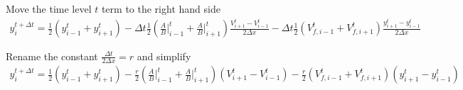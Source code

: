 Move the time level $t$ term to the right hand side
\begin{equation}
\begin{matrix}
y_i^{t+\Delta t} = \frac{1}{2}(y_{i-1}^t+y_{i+1}^t) -\Delta t\frac{1}{2}(\frac{A}{B}\vert_{i-1}^t + \frac{A}{B}\vert_{i+1}^t)\frac{V_{i+1}^{t}-V_{i-1}^t}{2\Delta x}-\Delta t \frac{1}{2}(V_{f,i-1}^t + V_{f,i+1}^t)\frac{y_{i+1}^{t}-y_{i-1}^t}{2\Delta x}\\
~\\
 \end{matrix}
\end{equation}
Rename the constant  $\frac{\Delta t}{2 \Delta x} = r$ and simplify
\begin{equation}
\begin{matrix}
y_i^{t+\Delta t} = \frac{1}{2}(y_{i-1}^t+y_{i+1}^t) -\frac{r}{2}(\frac{A}{B}\vert_{i-1}^t + \frac{A}{B}\vert_{i+1}^t)(V_{i+1}^{t}-V_{i-1}^t)-\frac{r}{2}(V_{f,i-1}^t + V_{f,i+1}^t)(y_{i+1}^{t}-y_{i-1}^t) \\
~\\
 \end{matrix}
 \label{eqn:lax-continunity}
\end{equation}

